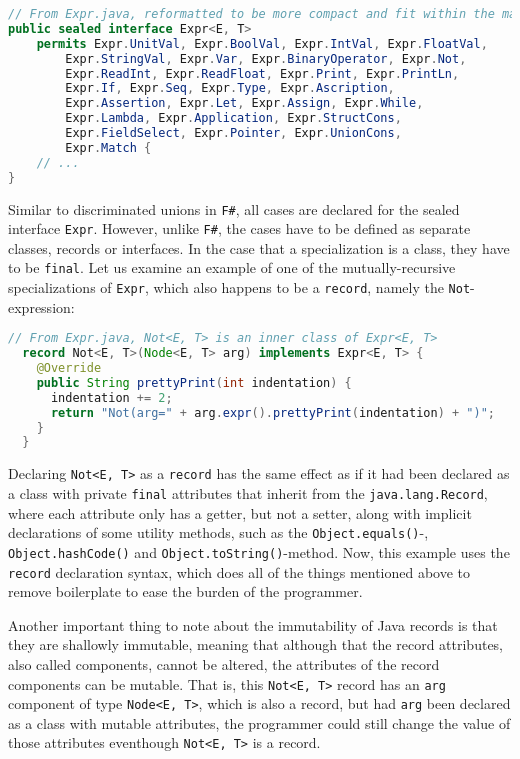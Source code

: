\begin{lstlisting}[language=Java]
// From Expr.java, reformatted to be more compact and fit within the margins
public sealed interface Expr<E, T>
    permits Expr.UnitVal, Expr.BoolVal, Expr.IntVal, Expr.FloatVal,
        Expr.StringVal, Expr.Var, Expr.BinaryOperator, Expr.Not,
        Expr.ReadInt, Expr.ReadFloat, Expr.Print, Expr.PrintLn,
        Expr.If, Expr.Seq, Expr.Type, Expr.Ascription,
        Expr.Assertion, Expr.Let, Expr.Assign, Expr.While,
        Expr.Lambda, Expr.Application, Expr.StructCons,
        Expr.FieldSelect, Expr.Pointer, Expr.UnionCons,
        Expr.Match {
    // ...
}
\end{lstlisting}

Similar to discriminated unions in \texttt{F\#}, all cases are declared for the sealed interface \texttt{Expr}. However, unlike \texttt{F\#},
the cases have to be defined as separate classes, records or interfaces. In the case that a specialization is a class, they have to be \texttt{final}.
Let us examine an example of one of the mutually-recursive specializations of \texttt{Expr}, which also happens to be a \texttt{record}, namely the \texttt{Not}-expression:

\begin{lstlisting}[language=Java]
  // From Expr.java, Not<E, T> is an inner class of Expr<E, T>
  record Not<E, T>(Node<E, T> arg) implements Expr<E, T> {
    @Override
    public String prettyPrint(int indentation) {
      indentation += 2;
      return "Not(arg=" + arg.expr().prettyPrint(indentation) + ")";
    }
  }
\end{lstlisting}

Declaring \texttt{Not<E, T>} as a \texttt{record} has the same effect as if it had been declared as a class with private \texttt{final}
attributes that inherit from the \texttt{java.lang.Record}, where each attribute only has a getter, but not a setter, along with implicit declarations
of some utility methods, such as the \texttt{Object.equals()}-, \texttt{Object.hashCode()} and \texttt{Object.toString()}-method. Now, this example uses the
\texttt{record} declaration syntax, which does all of the things mentioned above to remove boilerplate to ease the burden of the programmer.

Another important thing to note about the immutability of Java records is that they are shallowly immutable, meaning that although that the record
attributes, also called components, cannot be altered, the attributes of the record components can be mutable. That is, this \texttt{Not<E, T>} record
has an \texttt{arg} component of type \texttt{Node<E, T>}, which is also a record, but had \texttt{arg} been declared as a class with mutable
attributes, the programmer could still change the value of those attributes eventhough \texttt{Not<E, T>} is a record.


